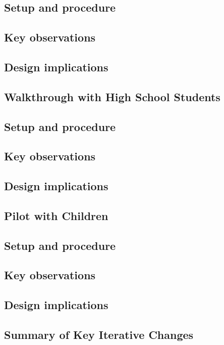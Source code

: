 \documentclass[a4paper]{usiinfbachelorproject}
\begin{document}
\subsection*{Setup and procedure}
\subsection*{Key observations}
\subsection*{Design implications}

\subsection{\textbf{Walkthrough with High School Students}}
\subsection*{Setup and procedure}
\subsection*{Key observations}
\subsection*{Design implications}

\subsection{\textbf{Pilot with Children}}
\subsection*{Setup and procedure}
\subsection*{Key observations}
\subsection*{Design implications}

\subsection{\textbf{Summary of Key Iterative Changes}}


\end{document}
